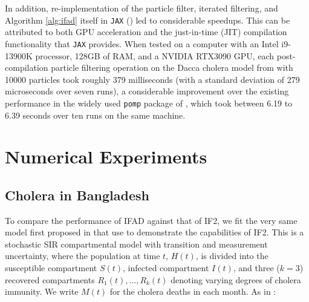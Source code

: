 \documentclass{article}
\begin{document}
In addition, re-implementation of the particle filter, iterated filtering, and Algorithm \ref{alg:ifad} itself in \texttt{JAX} (\cite{jax2018github}) led to considerable speedups. This can be attributed to both GPU acceleration and the just-in-time (JIT) compilation functionality that \texttt{JAX} provides. When tested on a computer with an Intel i9-13900K processor, 128GB of RAM, and a NVIDIA RTX3090 GPU, each post-compilation particle filtering operation on the Dacca cholera model from \cite{king08} with 10000 particles took roughly 379 milliseconds (with a standard deviation of 279 microseconds over seven runs), a considerable improvement over the existing performance in the widely used \texttt{pomp} package of \cite{king16}, which took between 6.19 to 6.39 seconds over ten runs on the same machine.




\section{Numerical Experiments}

\subsection{Cholera in Bangladesh}

To compare the performance of IFAD against that of IF2, we fit the very same model first proposed in \cite{king08} that \cite{ionides15} use to demonstrate the capabilities of IF2. This is a stochastic SIR compartmental model with transition and measurement uncertainty, where the population at time $t$, $H(t)$, is divided into the susceptible compartment $S(t)$, infected compartment $I(t)$, and three ($k=3$) recovered compartments $R_1(t), ..., R_k(t)$ denoting varying degrees of cholera immunity. We write $M(t)$ for the cholera deaths in each month. As in \cite{ionides15}:
\end{document}
